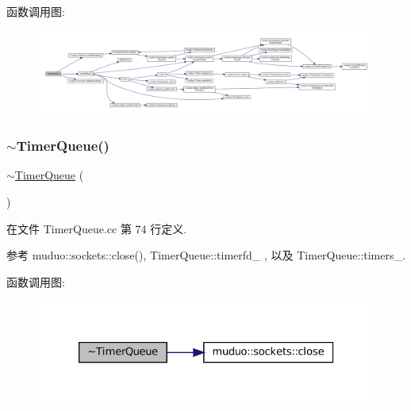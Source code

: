 函数调用图\+:
\nopagebreak
\begin{figure}[H]
\begin{center}
\leavevmode
\includegraphics[width=350pt]{classmuduo_1_1TimerQueue_a7ad41aed2409f7d424fd9cf7c0c5eac8_cgraph}
\end{center}
\end{figure}
\mbox{\label{classmuduo_1_1TimerQueue_a31b74dd52d3bff8688adcbbddc932901}} 
\subsubsection{\texorpdfstring{$\sim$\+Timer\+Queue()}{~TimerQueue()}}
{\footnotesize\ttfamily $\sim$\hyperlink{classmuduo_1_1TimerQueue}{Timer\+Queue} (\begin{DoxyParamCaption}{ }\end{DoxyParamCaption})}



在文件 Timer\+Queue.\+cc 第 74 行定义.



参考 muduo\+::sockets\+::close(), Timer\+Queue\+::timerfd\+\_\+ , 以及 Timer\+Queue\+::timers\+\_\+.

函数调用图\+:
\nopagebreak
\begin{figure}[H]
\begin{center}
\leavevmode
\includegraphics[width=326pt]{classmuduo_1_1TimerQueue_a31b74dd52d3bff8688adcbbddc932901_cgraph}
\end{center}
\end{figure}


